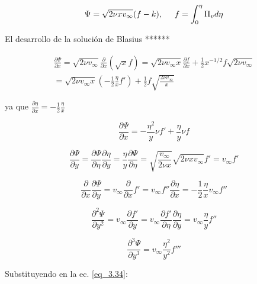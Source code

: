 \begin{equation}
	\Psi = \sqrt{2 \nu x v_\infty}(f-k), \hspace{0.5cm} f = \int_0^\eta \Pi_v d\eta
	\label{eq_3.39}
\end{equation}

El desarrollo de la solución de Blasius ******

\begin{multline*}
	\frac{\partial \Psi}{\partial x} = \sqrt{2 \nu v_\infty} \frac{\partial}{\partial x} (\sqrt{x} f) = \sqrt{2 \nu v_\infty x}  \frac{\partial f}{\partial x} + \frac{1}{2} x^{-1/2} f \sqrt{2 \nu v_\infty} \\
 = \sqrt{2 \nu v_\infty x} \left( - \frac{1}{2} \frac{\eta}{x} f' \right) + \frac{1}{2} f \sqrt{\frac{2 \nu v_\infty}{x}}
\end{multline*}

ya que $\frac{\partial \eta}{ \partial x} = - \frac{1}{2} \frac{\eta}{x}$

\begin{equation*}
	\frac{\partial \Psi}{\partial x} = - \frac{\eta^2}{y} \nu f' + \frac{\eta}{y} \nu f
\end{equation*}

\begin{equation*}
	\frac{\partial \Psi}{\partial y} = \frac{\partial \Psi}{\partial \eta} \frac{\partial \eta}{\partial y} = \frac{\eta}{y} \frac{\partial \Psi}{\partial \eta} = \sqrt{\frac{v_\infty}{2 \nu x}} \sqrt{2 \nu x v_\infty} f' = v_\infty f'
\end{equation*}

\begin{equation*}
	\frac{\partial}{\partial x} \frac{\partial \Psi}{\partial y} = v_\infty \frac{\partial}{\partial x} f' = v_\infty f'' \frac{\partial \eta}{\partial x} = -\frac{1}{2} \frac{\eta}{x} v_\infty f''
\end{equation*}

\begin{equation*}
	\frac{\partial^2 \Psi}{\partial y^2} = v_\infty \frac{\partial f'}{\partial y} = v_\infty \frac{\partial f'}{\partial \eta} \frac{\partial \eta}{\partial y} = v_\infty \frac{\eta}{y} f''
\end{equation*}

\begin{equation*}
	\frac{\partial^3 \Psi}{\partial y^3} = v_\infty \frac{\eta^2}{y^2} f'''
\end{equation*}

Substituyendo en la ec. \eqref{eq_3.34}:

